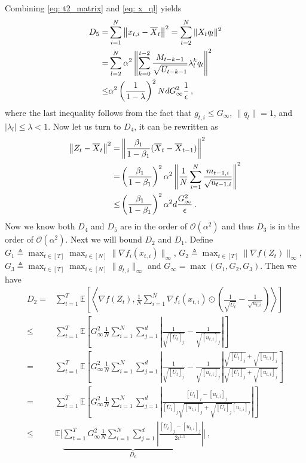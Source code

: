 \documentclass[11pt]{article}
\begin{document}
Combining \eqref{eq: t2_matrix} and \eqref{eq: x_ql} yields
\begin{align} \notag
D_5 =& 	\sum_{i=1}^N\left\| {  x_{t,i} -   \overline X_{t}}  \right\|^2
= \sum_{l=2}^N \|X_t q_l\|^2 \\\notag
=&  \sum_{l=2}^N \alpha^2 \left \| \sum_{k=0}^{t-2} \frac{M_{t-k-1}}{\sqrt{U_{t-k-1}}} \lambda_{l}^{k}  q_l\right\|^2 \\\label{eq: T_5_bound}
 \leq& \alpha^2 \left (\frac{1}{1-\lambda} \right)^2 Nd G_{\infty}^2 \frac{1}{\epsilon} \,  ,
\end{align}
where the last inequality follows from the fact that $g_{t,i} \leq G_{\infty}$, $\|q_l\| = 1$, and $|\lambda_l| \leq \lambda < 1$.
Now let us turn to $D_4$, it can be rewritten as 
\begin{align}\notag
\left\|  Z_{t} -  \overline X_{t}\right\|^2
=& \left\| \frac{\beta_1}{1-\beta_1} (\overline X_t - \overline X_{t-1}) \right \|^2\\\notag
=&\left( \frac{\beta_1}{1-\beta_1}\right)^2 \alpha^2 \left \|\frac{1}{N}\sum_{i=1}^N \frac{m_{t-1,i}}{\sqrt{u_{t-1,i}}}\right\|^2\\\notag
 \leq& \left( \frac{\beta_1}{1-\beta_1}\right)^2 \alpha^2 d \frac{G_{\infty}^2}{\epsilon}\, .
\end{align}
Now we know both $D_4$ and $D_5$ are in the order of  $\mathcal{O}(\alpha^2)$ and thus $D_3$ is in the order of  $\mathcal{O}(\alpha^2)$.
Next we will bound $D_2$ and $D_1$. Define  $G_1   \triangleq \max_{t \in [T]} \max_{i \in [N]} \|\nabla f_i(x_{t,i})\|_{\infty}$, $G_2   \triangleq \max_{t \in [T]}  \|\nabla f(Z_t)\|_{\infty}$, $G_3  \triangleq \max_{t \in [T]} \max_{i \in [N]} \|g_{t,i}\|_{\infty}$ and $G_{\infty} = \max(G_1,G_2,G_3)$.
Then we have 
\begin{align}\label{eq:T_2_bound}
D_2 =& \sum_{t=1}^T \mathbb E \left [ \left \langle \nabla f( Z_{t}), \frac{1}{N} \sum_{i=1}^N \nabla f_i( x_{t,i})\odot \left( \frac{1}{\sqrt{\overline U_{t}}} -\frac{1}{\sqrt{u_{t,i}}}  \right)  \right \rangle \right] \nonumber \\
\leq & \sum_{t=1}^T \mathbb E \left [  G_{\infty}^2  \frac{1}{N} \sum_{i=1}^N \sum_{j=1}^d \left| \frac{1}{\sqrt{[\overline U_{t}]_j}} -\frac{1}{\sqrt{[u_{t,i}]_{j}}}  \right| \right] \nonumber \\
= & \sum_{t=1}^T \mathbb E \left [  G_{\infty}^2  \frac{1}{N} \sum_{i=1}^N \sum_{j=1}^d \left| \frac{1}{\sqrt{[\overline U_{t}]_j}} -\frac{1}{\sqrt{[u_{t,i}]_{j}}}  \right| \frac{\sqrt{[\overline U_{t}]_j} + \sqrt{[u_{t,i}]_{j}} }{\sqrt{[\overline U_{t}]_j} + \sqrt{[u_{t,i}]_{j}}} \right] \nonumber \\
= & \sum_{t=1}^T \mathbb E \left [  G_{\infty}^2  \frac{1}{N} \sum_{i=1}^N \sum_{j=1}^d \left| \frac{[\overline U_{t}]_j - [u_{t,i}]_{j} }{{[\overline U_{t}]_j}\sqrt{[u_{t,i}]_{j}} + \sqrt{[\overline U_{t}]_j}{[u_{t,i}]_{j}}}  \right| \right] \nonumber \\
\leq &   \mathbb E \bigg [ \underbrace{ \sum_{t=1}^T  G_{\infty}^2  \frac{1}{N} \sum_{i=1}^N \sum_{j=1}^d \left| \frac{[\overline U_{t}]_j - [u_{t,i}]_{j} }{2 \epsilon^{1.5}}  \right| }_{D_6} \bigg ] \, , 
\end{align}
\end{document}
